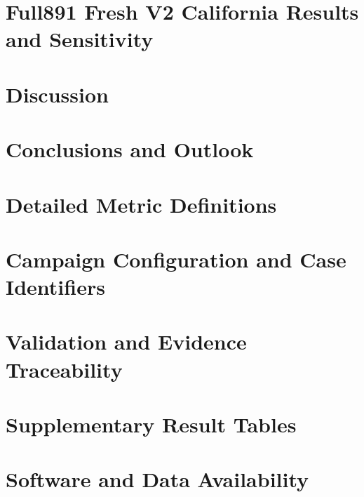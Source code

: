 \documentclass[
  a4paper,
  thesis=student,
  english,
  coverpage=false,
  titlepage=false,
  oneside,
  headmarks=true
]{tumbook}
\begin{document}
\chapter{Full891 Fresh V2 California Results and Sensitivity}

\chapter{Discussion}

\chapter{Conclusions and Outlook}


\appendix
\chapter{Detailed Metric Definitions}

\chapter{Campaign Configuration and Case Identifiers}

\chapter{Validation and Evidence Traceability}

\chapter{Supplementary Result Tables}

\chapter{Software and Data Availability}


\backmatter


\end{document}
